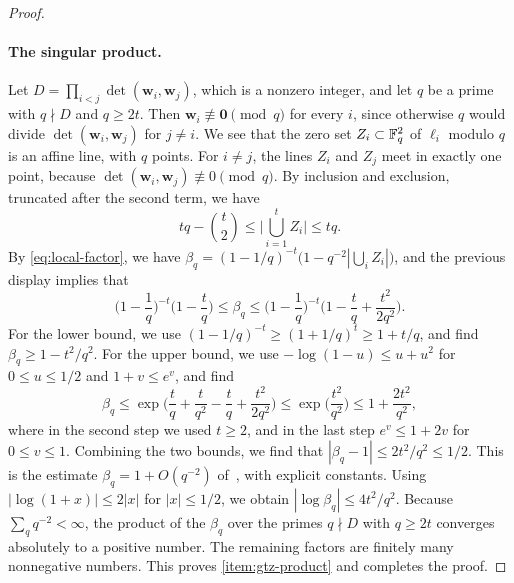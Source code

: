 \begin{proof}
\paragraph{The singular product.} Let $D=\prod_{i<j}\det(\mathbf w_i,\mathbf w_j)$, which is a nonzero integer, and let $q$ be a prime with $q\nmid D$ and $q\ge2t$. Then $\mathbf w_i\not\equiv\mathbf 0\pmod q$ for every $i$, since otherwise $q$ would divide $\det(\mathbf w_i,\mathbf w_j)$ for $j\ne i$. We see that the zero set $Z_i\subset\mathbb F_q^2$ of $\ell_i$ modulo $q$ is an affine line, with $q$ points. For $i\ne j$, the lines $Z_i$ and $Z_j$ meet in exactly one point, because $\det(\mathbf w_i,\mathbf w_j)\not\equiv0\pmod q$. By inclusion and exclusion, truncated after the second term, we have
\[
tq-\binom t2\le\Big|\bigcup_{i=1}^tZ_i\Big|\le tq.
\]
By \eqref{eq:local-factor}, we have $\beta_q=(1-1/q)^{-t}\big(1-q^{-2}|\bigcup_iZ_i|\big)$, and the previous display implies that
\begin{equation}\label{eq:gtz-generic-factor}
\Big(1-\frac1q\Big)^{-t}\Big(1-\frac tq\Big)\le\beta_q\le\Big(1-\frac1q\Big)^{-t}\Big(1-\frac tq+\frac{t^2}{2q^2}\Big).
\end{equation}
For the lower bound, we use $(1-1/q)^{-t}\ge(1+1/q)^t\ge1+t/q$, and find $\beta_q\ge1-t^2/q^2$. For the upper bound, we use $-\log(1-u)\le u+u^2$ for $0\le u\le1/2$ and $1+v\le e^v$, and find
\[
\beta_q\le\exp\Big(\frac tq+\frac t{q^2}-\frac tq+\frac{t^2}{2q^2}\Big)\le\exp\Big(\frac{t^2}{q^2}\Big)\le1+\frac{2t^2}{q^2},
\]
where in the second step we used $t\ge2$, and in the last step $e^v\le1+2v$ for $0\le v\le1$. Combining the two bounds, we find that $|\beta_q-1|\le2t^2/q^2\le1/2$. This is the estimate $\beta_q=1+O(q^{-2})$ of~\cite[Lemma~1.3]{GT2010}, with explicit constants. Using $|\log(1+x)|\le2|x|$ for $|x|\le1/2$, we obtain $|\log\beta_q|\le4t^2/q^2$. Because $\sum_q q^{-2}<\infty$, the product of the $\beta_q$ over the primes $q\nmid D$ with $q\ge2t$ converges absolutely to a positive number. The remaining factors are finitely many nonnegative numbers. This proves \ref{item:gtz-product} and completes the proof.
\end{proof}

